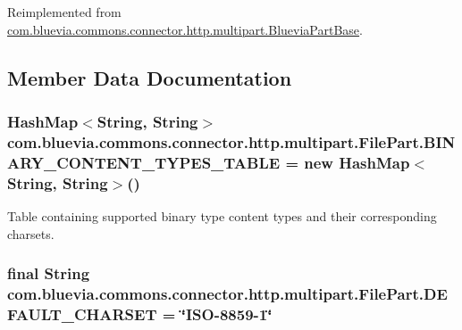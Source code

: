 Reimplemented from \hyperlink{classcom_1_1bluevia_1_1commons_1_1connector_1_1http_1_1multipart_1_1BlueviaPartBase}{com.bluevia.commons.connector.http.multipart.BlueviaPartBase}.



\subsection{Member Data Documentation}
\hypertarget{classcom_1_1bluevia_1_1commons_1_1connector_1_1http_1_1multipart_1_1FilePart_a2f89f61e068eb660946ba7a28ad09a5b}{
\subsubsection[{BINARY\_\-CONTENT\_\-TYPES\_\-TABLE}]{\setlength{\rightskip}{0pt plus 5cm}HashMap$<$String, String$>$ {\bf com.bluevia.commons.connector.http.multipart.FilePart.BINARY\_\-CONTENT\_\-TYPES\_\-TABLE} = new HashMap$<$String, String$>$()}}
\label{classcom_1_1bluevia_1_1commons_1_1connector_1_1http_1_1multipart_1_1FilePart_a2f89f61e068eb660946ba7a28ad09a5b}
Table containing supported binary type content types and their corresponding charsets. \hypertarget{classcom_1_1bluevia_1_1commons_1_1connector_1_1http_1_1multipart_1_1FilePart_acb902bd4273c47c862a713f482e00e7e}{
\subsubsection[{DEFAULT\_\-CHARSET}]{\setlength{\rightskip}{0pt plus 5cm}final String {\bf com.bluevia.commons.connector.http.multipart.FilePart.DEFAULT\_\-CHARSET} = \char`\"{}ISO-\/8859-\/1\char`\"{}}}
